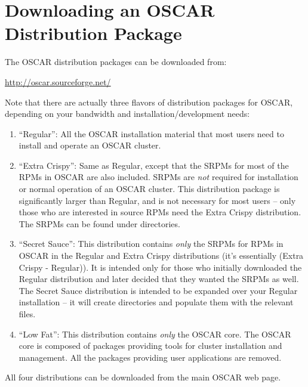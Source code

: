 %
% 
%
%
%

\section{Downloading an OSCAR Distribution Package}
\label{sec:download}

The OSCAR distribution packages can be downloaded from:

\vspace{11pt}
\centerline{\url{http://oscar.sourceforge.net/}}
\vspace{11pt}

Note that there are actually three flavors of distribution packages
for OSCAR, depending on your bandwidth and installation/development
needs:

\begin{enumerate}
\item ``Regular'': All the OSCAR installation material that most users
  need to install and operate an OSCAR cluster.
  
\item ``Extra Crispy'': Same as Regular, except that the SRPMs for
  most of the RPMs in OSCAR are also included.  SRPMs are {\em not}
  required for installation or normal operation of an OSCAR cluster.
  This distribution package is significantly larger than Regular, and
  is not necessary for most users -- only those who are interested in
  source RPMs need the Extra Crispy distribution.  The SRPMs can be
  found under  directories.
  
\item ``Secret Sauce'': This distribution contains {\em only} the
  SRPMs for RPMs in OSCAR in the Regular and Extra Crispy
  distributions (it's essentially (Extra Crispy - Regular)).  It is
  intended only for those who initially downloaded the Regular
  distribution and later decided that they wanted the SRPMs as well.
  The Secret Sauce distribution is intended to be expanded over your
  Regular installation -- it will create 
  directories and populate them with the relevant 
  files.

\item ``Low Fat'': This distribution contains {\em only} the OSCAR core. The
OSCAR core is composed of packages providing tools for cluster installation and
management. All the packages providing user applications are removed.
\end{enumerate}

All four distributions can be downloaded from the main OSCAR web
page.


